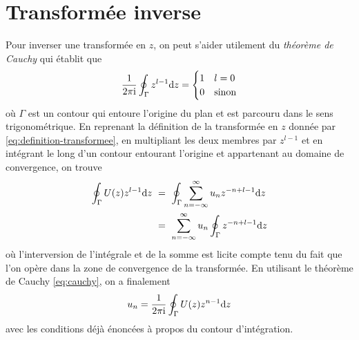 \section{Transformée inverse}
Pour inverser une transform\'{e}e en $z$, on peut s'aider utilement du \emph{théorème de Cauchy} qui \'{e}tablit que
\begin{equation}
\label{eq:cauchy}
\frac{1}{2\pi \mathrm{i}}\oint_{\Gamma}z^{l-1}\mathrm{d}  z= \begin{cases} 1 & l= 0 \\ 0 & \text{sinon} \end{cases}
\end{equation}
o\`{u} $\Gamma$ est un contour qui entoure l'origine du plan et est parcouru dans le sens trigonométrique. En reprenant la d\'{e}finition de la transform\'{e}e en $z$ donn\'{e}e par \eqref{eq:definition-transformee}, en multipliant les deux membres par $z^{l-1}$ et en int\'{e}grant le long d'un contour entourant l'origine et appartenant au domaine de convergence, on trouve
\begin{align*}
\oint_{\Gamma}U(z)z^{l-1}\rmd z\ &=\ \oint_{\Gamma}\sum_{n=-\infty}^{\infty} u_n z^{-n+l-1}\rmd z \\
&=\ \sum_{n=-\infty}^{\infty} u_n \oint_{\Gamma}z^{-n+l-1}\rmd z
\end{align*}
o\`{u} l'interversion de l'int\'{e}grale et de la somme est licite compte tenu du fait que l'on op\`{e}re dans la zone de convergence de la transform\'{e}e. En utilisant le th\'{e}or\`{e}me de Cauchy \eqref{eq:cauchy}, on a finalement
\begin{equation}
\label{eq:inverse-z}
u_n=\frac{1}{2\pi \mathrm{i}}\oint_{\Gamma} U(z)z^{n-1}\mathrm{d} z
\end{equation}
avec les conditions d\'{e}j\`{a} \'{e}nonc\'{e}es \`{a} propos du contour d'int\'{e}gration.

